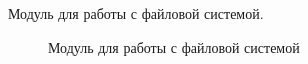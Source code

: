 Модуль для работы с файловой системой.

\begin{figure}[h]
\caption{Модуль для работы с файловой системой}
\label{package_diagram_file_system}
\end{figure}